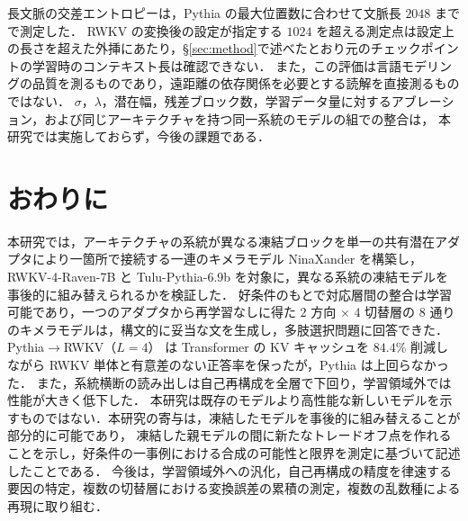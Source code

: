 \documentclass[techrep,noauthor]{ipsj}
\newcommand{\kw}[1]{#1}
\newcommand{\rev}[1]{{\color{blue}#1}}
\newcommand{\revr}[1]{{\color{red}#1}}
\newcommand{\revp}[1]{{\color{violet}#1}}
\newcommand{\PtoR}{\textsf{Pythia$\to$\allowbreak RWKV}}
\newcommand{\PtoRL}[1]{\PtoR{}（$L{=}#1$）}
\begin{document}
\rev{長文脈の交差エントロピーは，Pythia の最大位置数に合わせて文脈長 $2048$ までで測定した．
RWKV の変換後の設定が指定する $1024$ を超える測定点は設定上の長さを超えた外挿にあたり，\S\ref{sec:method}で述べたとおり元のチェックポイントの学習時のコンテキスト長は確認できない．}
また，この評価は言語モデリングの品質を測るものであり，遠距離の依存関係を必要とする読解を直接測るものではない．
$\sigma$，$\lambda$，潜在幅，残差ブロック数，学習データ量に対するアブレーション，および同じアーキテクチャを持つ同一系統のモデルの組での整合は，
\revp{本研究では}実施しておらず，今後の課題である．

\section{おわりに}\label{sec:conclusion}
\revr{本研究では，アーキテクチャの系統が異なる凍結ブロックを単一の共有潜在アダプタにより一箇所で接続する一連のキメラモデル
\kw{NinaXander} を構築し，RWKV-4-Raven-7B と Tulu-Pythia-6.9b を対象に，異なる系統の凍結モデルを事後的に組み替えられるかを検証した．
好条件のもとで対応層間の整合は学習可能であり，一つのアダプタから再学習なしに得た $2$ 方向 $\times$ $4$ 切替層の $8$ 通りのキメラモデルは，構文的に妥当な文を生成し，多肢選択問題に回答できた．
\PtoRL{4} は Transformer の KV キャッシュを $84.4\%$ 削減しながら RWKV 単体と有意差のない正答率を保ったが，Pythia は上回らなかった．
また，系統横断の読み出しは自己再構成を全層で下回り，学習領域外では性能が大きく低下した．
本研究は既存のモデルより高性能な新しいモデルを示すものではない．本研究の寄与は，凍結したモデルを事後的に組み替えることが部分的に可能であり，
凍結した親モデルの間に新たなトレードオフ点を作れることを示し，好条件の一事例における合成の可能性と限界を測定に基づいて記述したことである．
今後は，学習領域外への汎化，自己再構成の精度を律速する要因の特定，複数の切替層における変換誤差の累積の測定，複数の乱数種による再現に取り組む．}




\appendix
\end{document}

